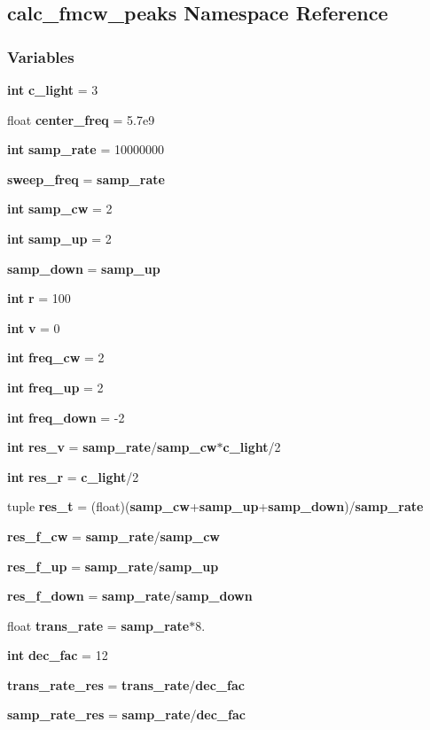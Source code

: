 \subsection{calc\+\_\+fmcw\+\_\+peaks Namespace Reference}
\label{namespacecalc__fmcw__peaks}
\subsubsection*{Variables}
\begin{DoxyCompactItemize}
\item 
{\bf int} {\bf c\+\_\+light} = 3
\item 
float {\bf center\+\_\+freq} = 5.\+7e9
\item 
{\bf int} {\bf samp\+\_\+rate} = 10000000
\item 
{\bf sweep\+\_\+freq} = {\bf samp\+\_\+rate}
\item 
{\bf int} {\bf samp\+\_\+cw} = 2
\item 
{\bf int} {\bf samp\+\_\+up} = 2
\item 
{\bf samp\+\_\+down} = {\bf samp\+\_\+up}
\item 
{\bf int} {\bf r} = 100
\item 
{\bf int} {\bf v} = 0
\item 
{\bf int} {\bf freq\+\_\+cw} = 2
\item 
{\bf int} {\bf freq\+\_\+up} = 2
\item 
{\bf int} {\bf freq\+\_\+down} = -\/2
\item 
{\bf int} {\bf res\+\_\+v} = {\bf samp\+\_\+rate}/{\bf samp\+\_\+cw}$\ast${\bf c\+\_\+light}/2
\item 
{\bf int} {\bf res\+\_\+r} = {\bf c\+\_\+light}/2
\item 
tuple {\bf res\+\_\+t} = (float)({\bf samp\+\_\+cw}+{\bf samp\+\_\+up}+{\bf samp\+\_\+down})/{\bf samp\+\_\+rate}
\item 
{\bf res\+\_\+f\+\_\+cw} = {\bf samp\+\_\+rate}/{\bf samp\+\_\+cw}
\item 
{\bf res\+\_\+f\+\_\+up} = {\bf samp\+\_\+rate}/{\bf samp\+\_\+up}
\item 
{\bf res\+\_\+f\+\_\+down} = {\bf samp\+\_\+rate}/{\bf samp\+\_\+down}
\item 
float {\bf trans\+\_\+rate} = {\bf samp\+\_\+rate}$\ast$8.
\item 
{\bf int} {\bf dec\+\_\+fac} = 12
\item 
{\bf trans\+\_\+rate\+\_\+res} = {\bf trans\+\_\+rate}/{\bf dec\+\_\+fac}
\item 
{\bf samp\+\_\+rate\+\_\+res} = {\bf samp\+\_\+rate}/{\bf dec\+\_\+fac}
\end{DoxyCompactItemize}


